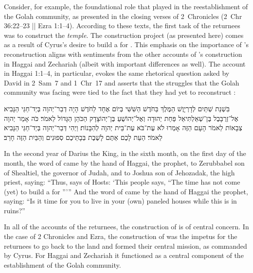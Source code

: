 Consider, for example, the foundational role that \thetemple played in the reestablishment of the Golah community, as presented in the closing verses of 2~Chronicles (2~Chr 36:22--23 || Ezra 1:1--4). According to these texts, the first task of the returnees was to construct the \emph{temple}. The construction project (as presented here) comes as a result of Cyrus's desire to build a \temple for \yahweh. This emphasis on the importance of \thetemple's reconstruction aligns with sentiments from the other accounts of \thetemple's construction in Haggai and Zechariah (albeit with important differences as well). The account in Haggai 1:1--4, in particular, evokes the same rhetorical question asked by David in 2~Sam~7 and 1~Chr~17 and asserts that the struggles that the Golah community was facing were tied to the fact that they had yet to reconstruct \thetemple:
\begin{hebrewtext}
    ‏בִּשְׁנַת שְׁתַּיִם לְדָרְיָוֶשׁ הַמֶּלֶךְ בַּחֹדֶשׁ הַשִּׁשִּׁי בְּיוֹם אֶחָד לַחֹדֶשׁ הָיָה דְבַר־יְהוָה בְּיַד־חַגַּי הַנָּבִיא אֶל־זְרֻבָּבֶל בֶּן־שְׁאַלְתִּיאֵל פַּחַת יְהוּדָה וְאֶל־יְהוֹשֻׁעַ בֶּן־יְהוֹצָדָק הַכֹּהֵן הַגָּדוֹל לֵאמֹר׃ 
    כֹּה אָמַר יְהוָה צְבָאוֹת לֵאמֹר הָעָם הַזֶּה אָמְרוּ לֹא עֶת־בֹּא עֶת־בֵּית יְהוָה לְהִבָּנוֹת׃  
    וַיְהִי דְּבַר־יְהוָה בְּיַד־חַגַּי הַנָּבִיא לֵאמֹר׃ 
    הַעֵת לָכֶם אַתֶּם לָשֶׁבֶת בְּבָתֵּיכֶם סְפוּנִים וְהַבַּיִת הַזֶּה חָרֵב׃
\end{hebrewtext}
\begin{translation}
    In the second year of Darius the King, in the sixth month, on the first day of the month, the word of \yahweh came by the hand of Haggai, the prophet, to Zerubbabel son of Shealtiel, the governor of Judah, and to Joshua son of Jehozadak, the high priest, saying: 
    ``Thus, says \yahweh of Hosts: `This people says, ``The time has not come (yet) to build a \temple for \yahweh''{}'{}''
    And the word of \yahweh came by the hand of Haggai the prophet, saying:
    ``Is it time for you to live in your (own) paneled houses while this \temple is in ruins?''
\end{translation}
\noindent
In all of the accounts of the returnees, the construction of \thetemple is of central concern. In the case of 2 Chronicles and Ezra, the construction of \thetemple was the impetus for the returnees to go back to the land and formed their central mission, as commanded by Cyrus. For Haggai and Zechariah it functioned as a central component of the establishment of the Golah community. 

